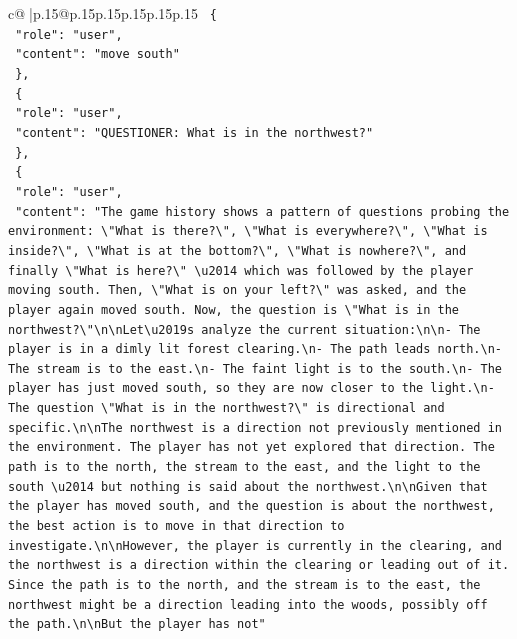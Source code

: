 \documentclass{article}
\begin{document}
{\begin{supertabular}{c@{$\;$}|p{.15\linewidth}@{}p{.15\linewidth}p{.15\linewidth}p{.15\linewidth}p{.15\linewidth}p{.15\linewidth}}
{{{\texttt{  \{} \\
\texttt{    "role": "user",} \\
\texttt{    "content": "move south"} \\
\texttt{  \},} \\
\texttt{  \{} \\
\texttt{    "role": "user",} \\
\texttt{    "content": "QUESTIONER: What is in the northwest?"} \\
\texttt{  \},} \\
\texttt{  \{} \\
\texttt{    "role": "user",} \\
\texttt{    "content": "The game history shows a pattern of questions probing the environment: \textbackslash{}"What is there?\textbackslash{}", \textbackslash{}"What is everywhere?\textbackslash{}", \textbackslash{}"What is inside?\textbackslash{}", \textbackslash{}"What is at the bottom?\textbackslash{}", \textbackslash{}"What is nowhere?\textbackslash{}", and finally \textbackslash{}"What is here?\textbackslash{}" \textbackslash{}u2014 which was followed by the player moving south. Then, \textbackslash{}"What is on your left?\textbackslash{}" was asked, and the player again moved south. Now, the question is \textbackslash{}"What is in the northwest?\textbackslash{}"\textbackslash{}n\textbackslash{}nLet\textbackslash{}u2019s analyze the current situation:\textbackslash{}n\textbackslash{}n{-} The player is in a dimly lit forest clearing.\textbackslash{}n{-} The path leads north.\textbackslash{}n{-} The stream is to the east.\textbackslash{}n{-} The faint light is to the south.\textbackslash{}n{-} The player has just moved south, so they are now closer to the light.\textbackslash{}n{-} The question \textbackslash{}"What is in the northwest?\textbackslash{}" is directional and specific.\textbackslash{}n\textbackslash{}nThe northwest is a direction not previously mentioned in the environment. The player has not yet explored that direction. The path is to the north, the stream to the east, and the light to the south \textbackslash{}u2014 but nothing is said about the northwest.\textbackslash{}n\textbackslash{}nGiven that the player has moved south, and the question is about the northwest, the best action is to move in that direction to investigate.\textbackslash{}n\textbackslash{}nHowever, the player is currently in the clearing, and the northwest is a direction within the clearing or leading out of it. Since the path is to the north, and the stream is to the east, the northwest might be a direction leading into the woods, possibly off the path.\textbackslash{}n\textbackslash{}nBut the player has not"} \\
}}}
\end{supertabular}}
\end{document}
